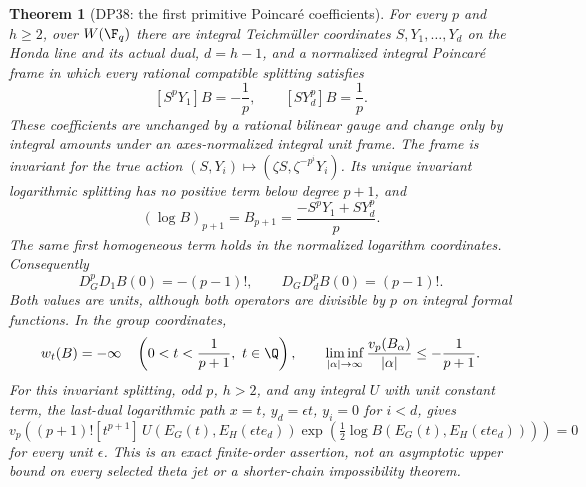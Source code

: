 \documentclass[11pt,a4paper]{article}
\newtheorem{theorem}{Theorem}[section]
\theoremstyle{definition}\newtheorem{remark}[theorem]{Remark}
\begin{document}
\begin{theorem}[DP38: the first primitive Poincar\'e coefficients]\label{DP38}
For every $p$ and $h\ge2$, over $W(\F_q)$ there are integral Teichm\"uller coordinates $S,Y_1,\ldots,Y_d$ on the Honda line and its actual dual, $d=h-1$, and a normalized integral Poincar\'e frame in which every rational compatible splitting satisfies
\[
 [S^pY_1]B=-\frac1p,\qquad [SY_d^p]B=\frac1p.
\]
These coefficients are unchanged by a rational bilinear gauge and change only by integral amounts under an axes-normalized integral unit frame. The frame is invariant for the true action $(S,Y_i)\mapsto(\zeta S,\zeta^{-p^i}Y_i)$. Its unique invariant logarithmic splitting has no positive term below degree $p+1$, and
\begin{equation}\label{eq:primitive-first}
 (\log B)_{p+1}=B_{p+1}=\frac{-S^pY_1+SY_d^p}{p}.
\end{equation}
The same first homogeneous term holds in the normalized logarithm coordinates. Consequently
\[
 D_G^pD_1 B(0)=-(p-1)!,\qquad D_GD_d^p B(0)=(p-1)!.
\]
Both values are units, although both operators are divisible by $p$ on integral formal functions. In the group coordinates,
\[
 w_t(B)=-\infty\quad\left(0<t<\frac1{p+1},\ t\in\Q\right),\qquad
 \liminf_{|\alpha|\to\infty}\frac{v_p(B_\alpha)}{|\alpha|}\le-\frac1{p+1}.
\]
For this invariant splitting, odd $p$, $h>2$, and any integral $U$ with unit constant term, the last-dual logarithmic path $x=t$, $y_d=\epsilon t$, $y_i=0$ for $i<d$, gives
\begin{equation}\label{eq:primitive-path-unit}
 v_p\left((p+1)![t^{p+1}]\,
 U(E_G(t),E_H(\epsilon te_d))
 \exp\left(\tfrac12\log B(E_G(t),E_H(\epsilon te_d))\right)\right)=0
\end{equation}
for every unit $\epsilon$. This is an exact finite-order assertion, not an asymptotic upper bound on every selected theta jet or a shorter-chain impossibility theorem.
\end{theorem}
\end{document}
